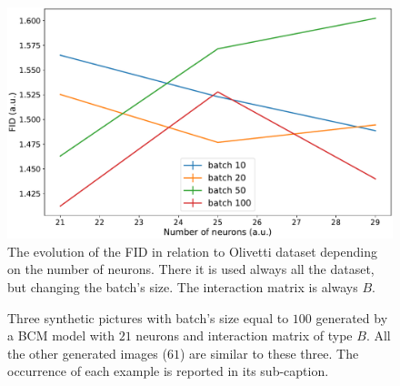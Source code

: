 \documentclass[a4paper,12pt]{article}
\begin{document}
\begin{figure}[!htb]
  \centering
  \includegraphics[width=.9\columnwidth]{all.pdf}
  \caption[FID changing batch's size]{The evolution of the FID in relation to Olivetti dataset depending on the number of neurons.
  There it is used always all the dataset, but changing the batch's size.
  The interaction matrix is always $B$.}
  \label{fig:all_g}
\end{figure}

\begin{figure}[!htb]
  \centering
  \caption[Pictures with batch $100$ and $N$ $21$]{Three synthetic pictures with batch's size equal to $100$ generated by a BCM model with $21$ neurons and interaction matrix of type $B$.
  All the other generated images ($61$) are similar to these three.
  The occurrence of each example is reported in its sub-caption.}
  \label{fig:all_p}
\end{figure}
\end{document}
